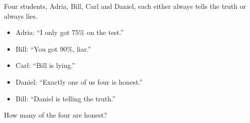 Four students, Adria, Bill, Carl and Daniel, each either always tells the truth or always lies.
\begin{itemize}
\item Adria: ``I only got $75\%$ on the test.''
\item Bill: ``You got $90\%$, liar.''
\item Carl: ``Bill is lying.''
\item Daniel: ``Exactly one of us four is honest.''
\item Bill: ``Daniel is telling the truth.''
\end{itemize}
How many of the four are honest?
